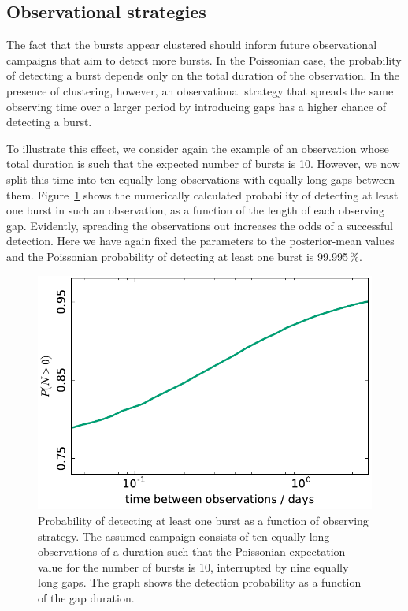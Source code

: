 \documentclass[fleqn,usenatbib]{mnras}
\newcommand{\new}[1]{#1}
\begin{document}
% 


\subsection{Observational strategies}
\label{sec:obs_strategies}

The fact that the bursts appear clustered should inform future observational campaigns that aim to detect more bursts. In the Poissonian case, the probability of detecting a burst depends only on the total duration of the observation. In the presence of clustering, however, an observational strategy that spreads the same observing time over a larger period by introducing gaps has a higher chance of detecting a burst.

To illustrate this effect, we consider \new{again the example of an observation whose total duration is such that the expected number of bursts is 10. However, we now split this time into ten equally long observations with equally long gaps between them.} Figure~\ref{fig:obs_strategy} shows the numerically calculated probability of detecting at least one burst in such an observation, as a function of the length of each observing gap. Evidently, spreading the observations out increases the odds of a successful detection. Here we have again fixed the parameters to the posterior-mean values \new{and the Poissonian probability of detecting at least one burst is 99.995\,\%.}

\begin{figure}
	\includegraphics[width=1.0\columnwidth]{obs_strategy.pdf}
	\caption{\label{fig:obs_strategy}Probability of detecting at least one burst as a function of observing strategy. The assumed campaign consists of ten \new{equally long} observations of \new{a duration such that the Poissonian expectation value for the number of bursts is 10}, interrupted by nine equally long gaps. The graph shows the detection probability as a function of the gap duration.}
\end{figure}
\end{document}

